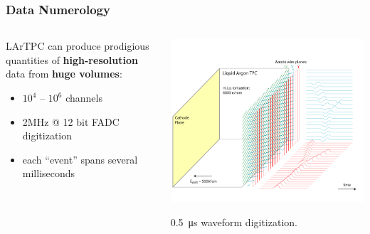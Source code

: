 \documentclass[xcolor=dvipsnames]{beamer}
\begin{document}
\begin{frame}
  \frametitle{Data Numerology}
  
  \vspace{-10mm}

  \begin{columns}
    \begin{column}{0.8\textwidth}
      LArTPC can produce prodigious quantities of \textbf{high-resolution} data from \textbf{huge volumes}:
      \begin{itemize}
      \item $10^4$ -- $10^6$ channels
      \item 2MHz @ 12 bit FADC digitization
      \item each ``event'' spans several milliseconds
      \end{itemize}
    \end{column}
    \begin{column}{0.2\textwidth}
      \begin{center}
        \includegraphics[width=\textwidth,trim=13cm 0cm 0cm 0cm,clip]{signal-15.png}

        \scriptsize \SI{0.5}{\micro\second} waveform digitization.
      \end{center}
    \end{column}
  \end{columns}

  \vspace{-5mm}


\end{frame}
\end{document}
